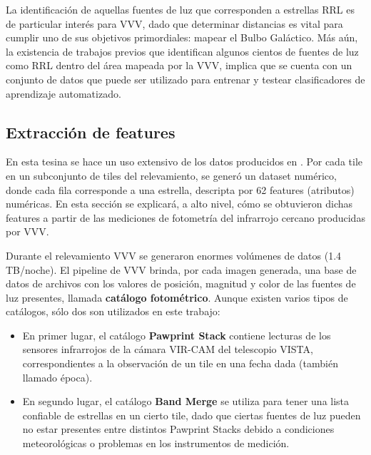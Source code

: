 \par La identificación de aquellas fuentes de luz que corresponden a estrellas RRL es de particular interés para VVV, dado que determinar distancias es vital para cumplir uno de sus objetivos primordiales: mapear el Bulbo Galáctico. Más aún, la existencia de trabajos previos \cite{gran1} \cite{gran2} que identifican algunos cientos de fuentes de luz como RRL dentro del área mapeada por la VVV, implica que se cuenta con un conjunto de datos que puede ser utilizado para entrenar y testear clasificadores de aprendizaje automatizado. 

\subsection{Extracción de features}

\par En esta tesina se hace un uso extensivo de los datos producidos en \cite{jbc}. Por cada tile en un subconjunto de tiles del relevamiento, se generó un dataset numérico, donde cada fila corresponde a una estrella, descripta por 62 features (atributos) numéricas. En esta sección se explicará, a alto nivel, cómo se obtuvieron dichas features a partir de las mediciones de fotometría del infrarrojo cercano producidas por VVV. \\

\par Durante el relevamiento VVV se generaron enormes volúmenes de datos (1.4 TB/noche). El pipeline de VVV \cite{emerson} brinda, por cada imagen generada, una base de datos de archivos con los valores de posición, magnitud y color de las fuentes de luz presentes, llamada \textbf{catálogo fotométrico}. Aunque existen varios tipos de catálogos,  sólo dos son utilizados en este trabajo:

\begin{itemize}
\item En primer lugar, el catálogo \textbf{Pawprint Stack} contiene lecturas de los sensores infrarrojos de la cámara VIR-CAM del telescopio VISTA, correspondientes a la observación de un tile en una fecha dada (también llamado época). 
\item En segundo lugar, el catálogo \textbf{Band Merge} se utiliza para tener una lista confiable de estrellas en un cierto tile, dado que ciertas fuentes de luz pueden no estar presentes entre distintos Pawprint Stacks debido a condiciones meteorológicas o problemas en los instrumentos de medición.
\end{itemize}


